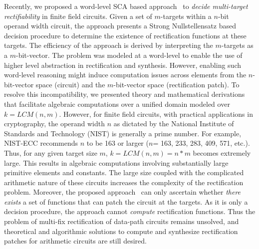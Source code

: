 Recently, we proposed a word-level SCA based approach~\cite{Vkrao:ISQED21} 
to {\it decide multi-target rectifiability} in finite field circuits. 
Given a set of $m$-targets within a $n$-bit operand width circuit, 
the approach presents a Strong Nullstellensatz based decision procedure
to determine the existence of rectification functions at these targets.
The efficiency of the approach is derived by interpreting the $m$-targets
as a $m$-bit-vector. The problem was modeled at a word-level to enable the use of 
higher level abstraction in rectification and synthesis. 
However, enabling such word-level reasoning might induce 
computation issues across elements from the $n$-bit-vector space (circuit) 
and the $m$-bit-vector space (rectification patch). To resolve this
incompatibility, we presented theory and mathematical derivations that
facilitate algebraic computations over a unified domain modeled over 
$k=LCM(n,m)$. However, for finite field circuits, with practical applications 
in cryptography, the operand width $n$ as dictated by the National 
Institute of Standards and Technology (NIST) is generally a prime number. 
For example, NIST-ECC recommends $n$ to be 163 or larger 
($n$= 163, 233, 283, 409, 571, etc.). Thus, for any given target size $m$, 
$k=LCM(n,m)=n*m$ becomes extremely large. This results in algebraic computations 
involving substantially large primitive elements and constants.
The large size coupled with the complicated arithmetic nature of these 
circuits increases the complexity of the rectification problem.
Moreover, the proposed approach~\cite{Vkrao:ISQED21} can only ascertain whether {\it there exists} a set of 
functions that can patch the circuit at the targets. As it is only a decision procedure, the 
approach cannot {\it compute} rectification functions. Thus the problem 
of multi-fix rectification of data-path circuits remains unsolved, and 
theoretical and algorithmic solutions to compute and synthesize 
rectification patches for arithmetic circuits are still desired.